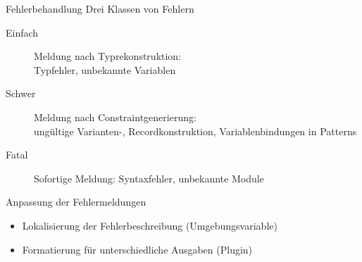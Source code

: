\documentclass
[handout]
{beamer}
\begin{document}

\begin{frame}{Fehlerbehandlung}
  Drei Klassen von Fehlern
  \begin{description}
    \item[Einfach] Meldung nach Typrekonstruktion: \\
      Typfehler, unbekannte Variablen
    \item[Schwer] Meldung nach Constraintgenerierung: \\
      ungültige Varianten-, Recordkonstruktion, Variablenbindungen in Patterns
    \item[Fatal] Sofortige Meldung: Syntaxfehler, unbekannte Module
  \end{description}
  Anpassung der Fehlermeldungen
  \begin{itemize}
    \item Lokalisierung der Fehlerbeschreibung (Umgebungsvariable)
    \item Formatierung für unterschiedliche Ausgaben (Plugin)
  \end{itemize}
\end{frame}
\end{document}
